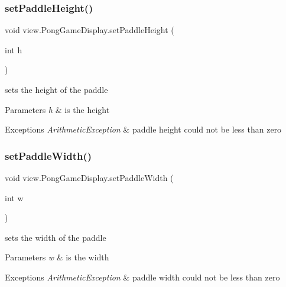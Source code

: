 \subsubsection{\texorpdfstring{set\+Paddle\+Height()}{setPaddleHeight()}}
{\footnotesize\ttfamily void view.\+Pong\+Game\+Display.\+set\+Paddle\+Height (\begin{DoxyParamCaption}\item[{int}]{h }\end{DoxyParamCaption})}



sets the height of the paddle 


\begin{DoxyParams}{Parameters}
{\em h} & is the height \\
\hline
\end{DoxyParams}

\begin{DoxyExceptions}{Exceptions}
{\em Arithmetic\+Exception} & paddle height could not be less than zero \\
\hline
\end{DoxyExceptions}
\hypertarget{classview_1_1_pong_game_display_ac42d38f9ed29e2ab2bec6c7da46f1c0e}{}\label{classview_1_1_pong_game_display_ac42d38f9ed29e2ab2bec6c7da46f1c0e} 
\subsubsection{\texorpdfstring{set\+Paddle\+Width()}{setPaddleWidth()}}
{\footnotesize\ttfamily void view.\+Pong\+Game\+Display.\+set\+Paddle\+Width (\begin{DoxyParamCaption}\item[{int}]{w }\end{DoxyParamCaption})}



sets the width of the paddle 


\begin{DoxyParams}{Parameters}
{\em w} & is the width \\
\hline
\end{DoxyParams}

\begin{DoxyExceptions}{Exceptions}
{\em Arithmetic\+Exception} & paddle width could not be less than zero \\
\hline
\end{DoxyExceptions}
\hypertarget{classview_1_1_pong_game_display_a8b9caa56b471453556b7380ee6d37340}{}\label{classview_1_1_pong_game_display_a8b9caa56b471453556b7380ee6d37340} 
